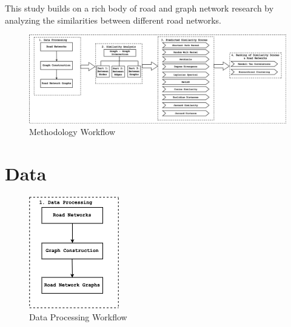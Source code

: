 
This study builds on a rich body of road and graph network research by analyzing the similarities between different road networks.

\begin{figure}[h]
\centering
\includegraphics[width=1.25\textwidth,center]{picture/flows.png}
\caption[Methodology Workflow]{Methodology Workflow}
\label{fig:Methodology Workflow}
\end{figure}


\section{Data}
\begin{figure}[h!]
\centering
\includegraphics[width=0.35\textwidth,center]{picture/flow1.png}
\caption[Data Processing Workflow]{Data Processing Workflow}
\label{fig:Data Processing Workflow}
\end{figure}

